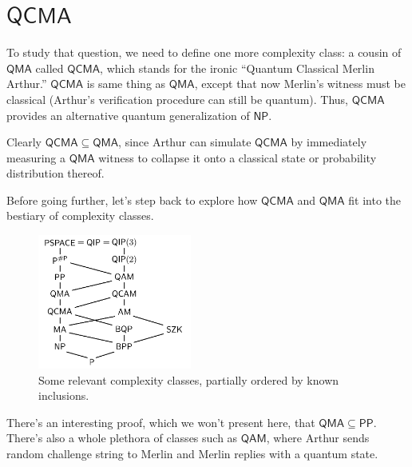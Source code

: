 \documentclass[11pt]{report}
\theoremstyle{plain}
\theoremstyle{definition}
\begin{document}
\section{$\mathsf{QCMA}$}

To study that question, we need to define one more complexity class: a cousin of $\mathsf{QMA}$ called $\mathsf{QCMA}$, which stands for the ironic ``Quantum Classical Merlin Arthur.'' $\mathsf{QCMA}$ is same thing as $\mathsf{QMA}$, except that now Merlin's witness must be classical (Arthur's verification procedure can still be quantum).  Thus, $\mathsf{QCMA}$ provides an alternative quantum generalization of $\mathsf{NP}$.

Clearly $\mathsf{QCMA} \subseteq \mathsf{QMA}$, since Arthur can simulate $\mathsf{QCMA}$ by immediately measuring a $\mathsf{QMA}$ witness to collapse it onto a classical state or probability distribution thereof.

Before going further, let's step back to explore how $\mathsf{QCMA}$ and $\mathsf{QMA}$ fit into the bestiary of complexity classes.

\begin{figure}[h!]\label{fig:ComplexityClassHierarchy}
  \begin{center}
\includegraphics[width=0.45\textwidth]{ComplexityClassLattice.png}
\caption{Some relevant complexity classes, partially ordered by known inclusions.}
  \end{center}
\end{figure}

There's an interesting proof, which we won't present here, that $\mathsf{QMA} \subseteq \mathsf{PP}$.  There's also a whole plethora of classes such as $\mathsf{QAM}$, where Arthur sends random challenge string to Merlin and Merlin replies with a quantum state.
\end{document}
